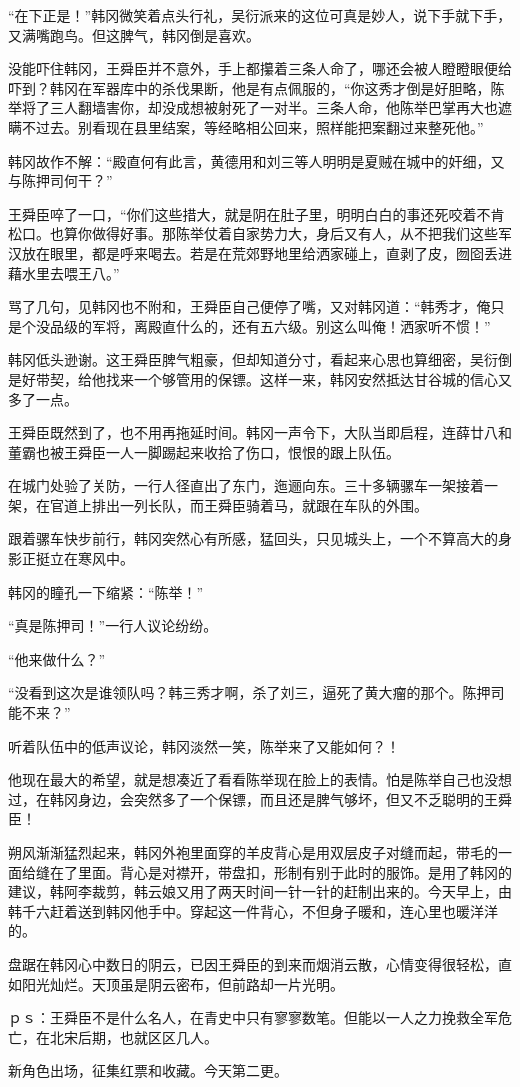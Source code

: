 “在下正是！”韩冈微笑着点头行礼，吴衍派来的这位可真是妙人，说下手就下手，又满嘴跑鸟。但这脾气，韩冈倒是喜欢。

没能吓住韩冈，王舜臣并不意外，手上都攥着三条人命了，哪还会被人瞪瞪眼便给吓到？韩冈在军器库中的杀伐果断，他是有点佩服的，“你这秀才倒是好胆略，陈举将了三人翻墙害你，却没成想被射死了一对半。三条人命，他陈举巴掌再大也遮瞒不过去。别看现在县里结案，等经略相公回来，照样能把案翻过来整死他。”

韩冈故作不解：“殿直何有此言，黄德用和刘三等人明明是夏贼在城中的奸细，又与陈押司何干？”

王舜臣啐了一口，“你们这些措大，就是阴在肚子里，明明白白的事还死咬着不肯松口。也算你做得好事。那陈举仗着自家势力大，身后又有人，从不把我们这些军汉放在眼里，都是呼来喝去。若是在荒郊野地里给洒家碰上，直剥了皮，囫囵丢进藉水里去喂王八。”

骂了几句，见韩冈也不附和，王舜臣自己便停了嘴，又对韩冈道：“韩秀才，俺只是个没品级的军将，离殿直什么的，还有五六级。别这么叫俺！洒家听不惯！”

韩冈低头逊谢。这王舜臣脾气粗豪，但却知道分寸，看起来心思也算细密，吴衍倒是好带契，给他找来一个够管用的保镖。这样一来，韩冈安然抵达甘谷城的信心又多了一点。

王舜臣既然到了，也不用再拖延时间。韩冈一声令下，大队当即启程，连薛廿八和董霸也被王舜臣一人一脚踢起来收拾了伤口，恨恨的跟上队伍。

在城门处验了关防，一行人径直出了东门，迤逦向东。三十多辆骡车一架接着一架，在官道上排出一列长队，而王舜臣骑着马，就跟在车队的外围。

跟着骡车快步前行，韩冈突然心有所感，猛回头，只见城头上，一个不算高大的身影正挺立在寒风中。

韩冈的瞳孔一下缩紧：“陈举！”

“真是陈押司！”一行人议论纷纷。

“他来做什么？”

“没看到这次是谁领队吗？韩三秀才啊，杀了刘三，逼死了黄大瘤的那个。陈押司能不来？”

听着队伍中的低声议论，韩冈淡然一笑，陈举来了又能如何？！

他现在最大的希望，就是想凑近了看看陈举现在脸上的表情。怕是陈举自己也没想过，在韩冈身边，会突然多了一个保镖，而且还是脾气够坏，但又不乏聪明的王舜臣！

朔风渐渐猛烈起来，韩冈外袍里面穿的羊皮背心是用双层皮子对缝而起，带毛的一面给缝在了里面。背心是对襟开，带盘扣，形制有别于此时的服饰。是用了韩冈的建议，韩阿李裁剪，韩云娘又用了两天时间一针一针的赶制出来的。今天早上，由韩千六赶着送到韩冈他手中。穿起这一件背心，不但身子暖和，连心里也暖洋洋的。

盘踞在韩冈心中数日的阴云，已因王舜臣的到来而烟消云散，心情变得很轻松，直如阳光灿烂。天顶虽是阴云密布，但前路却一片光明。

ｐｓ：王舜臣不是什么名人，在青史中只有寥寥数笔。但能以一人之力挽救全军危亡，在北宋后期，也就区区几人。

新角色出场，征集红票和收藏。今天第二更。

